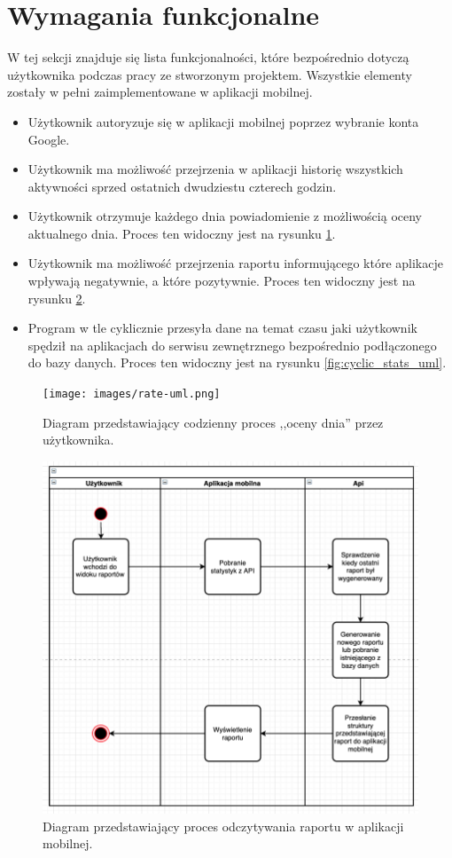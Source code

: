 \documentclass[a4paper,twoside,12pt]{book}
\begin{document}
\section{Wymagania funkcjonalne}
W tej sekcji znajduje się lista funkcjonalności, które bezpośrednio dotyczą użytkownika podczas pracy ze stworzonym projektem. Wszystkie elementy zostały w pełni zaimplementowane w aplikacji mobilnej.
\begin{itemize}
  \item Użytkownik autoryzuje się w aplikacji mobilnej poprzez wybranie konta Google.
  \item Użytkownik ma możliwość przejrzenia w aplikacji historię wszystkich aktywności sprzed ostatnich dwudziestu czterech godzin.
  \item Użytkownik otrzymuje każdego dnia powiadomienie z możliwością oceny aktualnego dnia. Proces ten widoczny jest na rysunku \ref{fig:rate_uml}.
  \item Użytkownik ma możliwość przejrzenia raportu informującego które aplikacje wpływają negatywnie, a które pozytywnie. Proces ten widoczny jest na rysunku \ref{fig:raport_uml}. 
  \item Program w tle cyklicznie przesyła dane na temat czasu jaki użytkownik spędził na aplikacjach do serwisu zewnętrznego bezpośrednio podłączonego do bazy danych. Proces ten widoczny jest na rysunku \ref{fig:cyclic_stats_uml}.
\end{itemize}

\begin{figure}[!htbp]
    \centering
    \texttt{[image: images/rate-uml.png]}
    \caption{Diagram przedstawiający codzienny proces ,,oceny dnia'' przez użytkownika.}
    \label{fig:rate_uml}
\end{figure}

\begin{figure}[!htbp]
    \centering
    \includegraphics[scale=0.5]{images/raport-uml.png}
    \caption{Diagram przedstawiający proces odczytywania raportu w aplikacji mobilnej.}
    \label{fig:raport_uml}
\end{figure}
\end{document}
